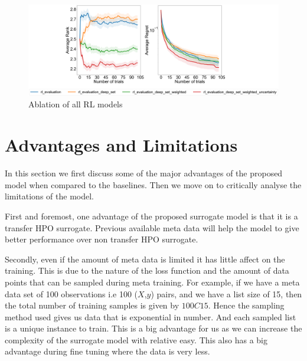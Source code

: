 \documentclass[12pt, twoside, ngerman]{report}
\begin{document}
\begin{figure}[h]
  \centering
    \includegraphics[scale=0.20]{images/FinalAblation}
    \caption{Ablation of all RL models}
    \label{fig:FinalAblation}
\end{figure}

\section{Advantages and Limitations}


In this section we first discuss some of the major advantages of the proposed model when compared to the baselines.
Then we move on to critically analyse the limitations of the model.

First and foremost,  one advantage of the proposed surrogate model is that it is a transfer HPO surrogate.  Previous available meta data will help the model to give better performance over non transfer HPO surrogate.

Secondly,  even if the amount of meta data is limited it has little affect on the training.
This is due to the nature of the loss function and the amount of data points that can be sampled during meta training.
For example,  if we have a meta data set of 100 observations i.e 100 ($X$,$y$) pairs,  and we have a list size of 15,  then the total number of training samples is given by $100C15$.
Hence the sampling method used gives us data that is exponential in number.
And each sampled list is a unique instance to train.
This is a big advantage for us as we can increase the complexity of the surrogate model with relative easy.
This also has a big advantage during fine tuning where the data is very less.
\end{document}
